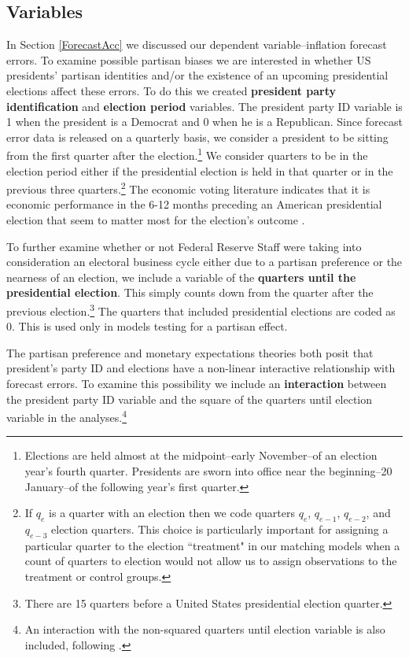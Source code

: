\documentclass[a4paper]{article}\usepackage{graphicx, color}
\begin{document}
\subsection{Variables}

In Section \ref{ForecastAcc} we discussed our dependent variable--inflation forecast errors. To examine possible partisan biases we are interested in whether US presidents' partisan identities and/or the existence of an upcoming presidential elections affect these errors. To do this we created {\bf{president party identification}} and {\bf{election period}} variables. The president party ID variable is 1 when the president is a Democrat and 0 when he is a Republican. Since forecast error data is released on a quarterly basis, we consider a president to be sitting from the first quarter after the election.\footnote{Elections are held almost at the midpoint--early November--of an election year's fourth quarter. Presidents are sworn into office near the beginning--20 January--of the following year's first quarter.} We consider quarters to be in the election period either if the presidential election is held in that quarter or in the previous three quarters.\footnote{If $q_{e}$ is a quarter with an election then we code quarters $q_{e}$, $q_{e-1}$, $q_{e-2}$, and $q_{e-3}$  election quarters. This choice is particularly important for assigning a particular quarter to the election ``treatment" in our matching models when a count of quarters to election would not allow us to assign observations to the treatment or control groups.} The economic voting literature indicates that it is economic performance in the 6-12 months preceding an American presidential election that seem to matter most for the election's outcome \citep[c.f][]{Gelman1993}. 

To further examine whether or not Federal Reserve Staff were taking into consideration an electoral business cycle either due to a partisan preference or the nearness of an election, we include a variable of the {\bf{quarters until the presidential election}}. This simply counts down from the quarter after the previous election.\footnote{There are 15 quarters before a United States presidential election quarter.} The quarters that included presidential elections are coded as 0. This is used only in models testing for a partisan effect.

The partisan preference and monetary expectations theories both posit that president's party ID and elections have a non-linear interactive relationship with forecast errors. To examine this possibility we include an \textbf{interaction} between the president party ID variable and the square of the quarters until election variable in the analyses.\footnote{An interaction with the non-squared quarters until election variable is also included, following \citep{Brambor2006}.}
\end{document}

